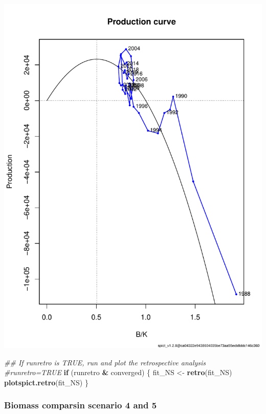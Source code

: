 \documentclass[
]{article}
\newenvironment{Shaded}{\begin{snugshade}}{\end{snugshade}}
\newcommand{\CommentTok}[1]{\textcolor[rgb]{0.56,0.35,0.01}{\textit{#1}}}
\newcommand{\ControlFlowTok}[1]{\textcolor[rgb]{0.13,0.29,0.53}{\textbf{#1}}}
\newcommand{\KeywordTok}[1]{\textcolor[rgb]{0.13,0.29,0.53}{\textbf{#1}}}
\newcommand{\NormalTok}[1]{#1}
\newcommand{\OperatorTok}[1]{\textcolor[rgb]{0.81,0.36,0.00}{\textbf{#1}}}
\newcommand{\StringTok}[1]{\textcolor[rgb]{0.31,0.60,0.02}{#1}}
\begin{document}
\includegraphics{aru.27.123a4_SPiCT_WD_files/figure-latex/diagnostics_scenario_5-2.pdf}

\begin{Shaded}
\begin{Highlighting}[]
  \CommentTok{## If runretro is TRUE, run and plot the retrospective analysis}
  \CommentTok{#runretro=TRUE}
\ControlFlowTok{if}\NormalTok{ (runretro }\OperatorTok{&}\StringTok{ }\NormalTok{converged) \{}
\NormalTok{    fit_NS <-}\StringTok{ }\KeywordTok{retro}\NormalTok{(fit_NS)}
    \KeywordTok{plotspict.retro}\NormalTok{(fit_NS)}
\NormalTok{  \}}
\end{Highlighting}
\end{Shaded}

\hypertarget{biomass-comparsin-scenario-4-and-5}{%
\subsubsection{Biomass comparsin scenario 4 and
5}\label{biomass-comparsin-scenario-4-and-5}}
\end{document}

